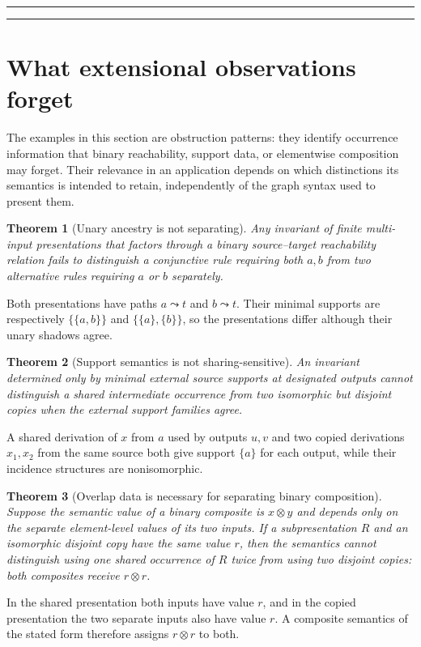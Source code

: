 \documentclass[12pt,a4paper,twoside]{extarticle}
\makeatletter
\theoremstyle{compactplain}
\newtheorem{theorem}{Theorem}[section]
\theoremstyle{compactdef}
\renewenvironment{proof}[1][\proofname]{\par\pushQED{\qed}\normalfont
  \topsep2pt\trivlist\item[\hskip\labelsep\bfseries #1\@addpunct{.}]\ignorespaces}
 {\popQED\endtrivlist\@endpefalse}
\newcommand{\compactpart}[2]{%
  \par\vspace{1.5ex}\noindent\rule{\linewidth}{.3pt}\par
  \noindent{\bfseries\fontsize{9.4}{10.4}\selectfont #1. #2}\par
  \vspace{.45ex}\noindent\rule{\linewidth}{.3pt}\par\vspace{.6ex}}
\makeatother
\begin{document}
\compactpart{II}{Separation, Reification, and Transport}

\section{What extensional observations forget}\label{sec:information-loss}
The examples in this section are obstruction patterns: they identify occurrence information that binary reachability, support data, or elementwise composition may forget.  Their relevance in an application depends on which distinctions its semantics is intended to retain, independently of the graph syntax used to present them.

\begin{theorem}[Unary ancestry is not separating]
Any invariant of finite multi-input presentations that factors through a binary source--target reachability relation fails to distinguish a conjunctive rule requiring both $a,b$ from two alternative rules requiring $a$ or $b$ separately.
\end{theorem}
\begin{proof}
Both presentations have paths $a\leadsto t$ and $b\leadsto t$.  Their minimal supports are respectively $\{\{a,b\}\}$ and $\{\{a\},\{b\}\}$, so the presentations differ although their unary shadows agree.
\end{proof}

\begin{theorem}[Support semantics is not sharing-sensitive]
An invariant determined only by minimal external source supports at designated outputs cannot distinguish a shared intermediate occurrence from two isomorphic but disjoint copies when the external support families agree.
\end{theorem}
\begin{proof}
A shared derivation of $x$ from $a$ used by outputs $u,v$ and two copied derivations $x_1,x_2$ from the same source both give support $\{a\}$ for each output, while their incidence structures are nonisomorphic.
\end{proof}

\begin{theorem}[Overlap data is necessary for separating binary composition]
Suppose the semantic value of a binary composite is $x\otimes y$ and depends only on the separate element-level values of its two inputs.  If a subpresentation $R$ and an isomorphic disjoint copy have the same value $r$, then the semantics cannot distinguish using one shared occurrence of $R$ twice from using two disjoint copies: both composites receive $r\otimes r$.
\end{theorem}
\begin{proof}
In the shared presentation both inputs have value $r$, and in the copied presentation the two separate inputs also have value $r$.  A composite semantics of the stated form therefore assigns $r\otimes r$ to both.
\end{proof}
\end{document}
